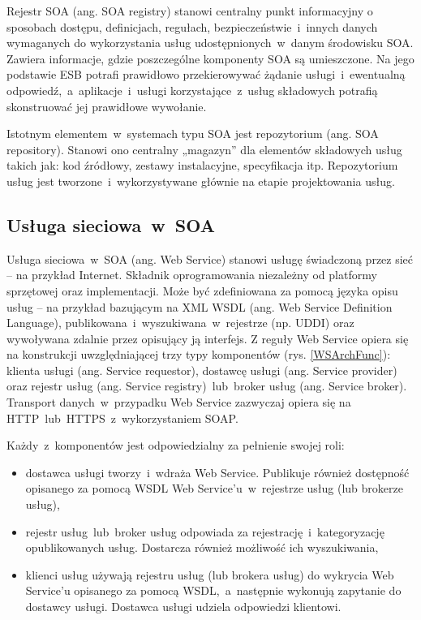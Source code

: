 Rejestr SOA (ang. SOA registry) stanowi centralny punkt informacyjny o sposobach dostępu, definicjach, regułach, bezpieczeństwie~i~innych danych wymaganych do wykorzystania usług udostępnionych~w~danym środowisku SOA. Zawiera informacje, gdzie poszczególne komponenty SOA są umieszczone. Na jego podstawie ESB potrafi prawidłowo przekierowywać żądanie usługi~i~ewentualną odpowiedź,~a~aplikacje~i~usługi korzystające~z~usług składowych potrafią skonstruować jej prawidłowe wywołanie.
	
Istotnym elementem~w~systemach typu SOA jest repozytorium (ang. SOA repository). Stanowi ono centralny „magazyn” dla elementów składowych usług takich jak: kod źródłowy, zestawy instalacyjne, specyfikacja itp. Repozytorium usług jest tworzone~i~wykorzystywane głównie na etapie projektowania usług.

\subsection{Usługa sieciowa~w~SOA}
Usługa sieciowa~w~SOA (ang. Web Service) stanowi usługę świadczoną przez sieć – na przykład Internet. Składnik oprogramowania niezależny od platformy sprzętowej oraz implementacji. Może być zdefiniowana za pomocą języka opisu usług – na przykład bazującym na XML WSDL (ang. Web Service Definition Language), publikowana~i~wyszukiwana~w~rejestrze (np. UDDI) oraz wywoływana zdalnie przez opisujący ją interfejs. 
Z reguły Web Service opiera się na konstrukcji uwzględniającej trzy typy komponentów (rys. \ref{WSArchFunc}): klienta usługi (ang. Service requestor), dostawcę usługi (ang. Service provider) oraz rejestr usług (ang. Service registry)~lub~broker usług (ang. Service broker).  Transport danych~w~przypadku Web Service zazwyczaj opiera się na HTTP~lub~HTTPS~z~wykorzystaniem SOAP.

Każdy~z~komponentów jest odpowiedzialny za pełnienie swojej roli:
\begin{itemize}
\item{dostawca usługi tworzy~i~wdraża Web Service. Publikuje również dostępność opisanego za pomocą WSDL Web Service’u~w~rejestrze usług (lub brokerze usług),}
\item{rejestr usług~lub~broker usług odpowiada za rejestrację~i~kategoryzację opublikowanych usług. Dostarcza również możliwość ich wyszukiwania,} 
\item{klienci usług używają rejestru usług (lub brokera usług) do wykrycia Web Service’u opisanego za pomocą WSDL,~a~następnie wykonują zapytanie do dostawcy usługi. Dostawca usługi udziela odpowiedzi klientowi.}
\end{itemize}

